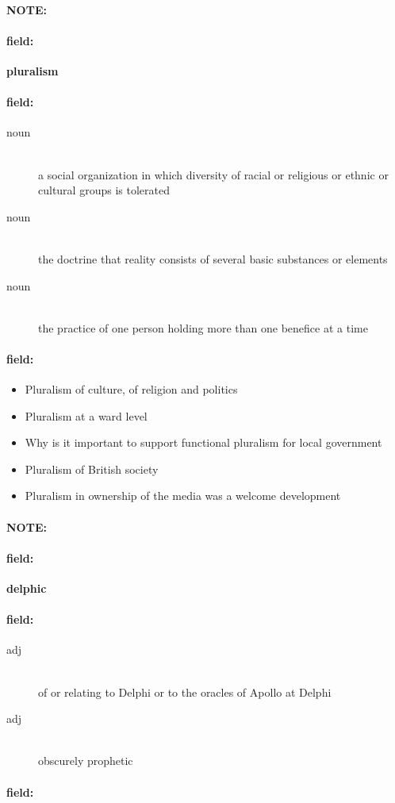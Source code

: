 \documentclass[12pt]{article}
\newenvironment{note}{\paragraph{NOTE:}}{}
\newenvironment{field}{\paragraph{field:}}{}
\begin{document}
\begin{note}
\begin{field}
\textbf{\large pluralism}
\end{field}


\begin{field}
\begin{description}
\item[noun] \hfill \\ 
a social organization in which diversity of racial or religious or ethnic or cultural groups is tolerated

\item[noun] \hfill \\ 
the doctrine that reality consists of several basic substances or elements

\item[noun] \hfill \\ 
the practice of one person holding more than one benefice at a time

\end{description}
\end{field}

\begin{field}
\begin{itemize}
\item Pluralism of culture, of religion and politics
\item Pluralism at a ward level
\item Why is it important to support functional pluralism for local government
\item Pluralism of British society
\item Pluralism in ownership of the media was a welcome development
\end{itemize}
\end{field}
\end{note}
\begin{note}
\begin{field}
\textbf{\large delphic}
\end{field}


\begin{field}
\begin{description}
\item[adj] \hfill \\ 
of or relating to Delphi or to the oracles of Apollo at Delphi

\item[adj] \hfill \\ 
obscurely prophetic

\end{description}
\end{field}

\begin{field}
\end{field}
\end{note}
\end{document}
